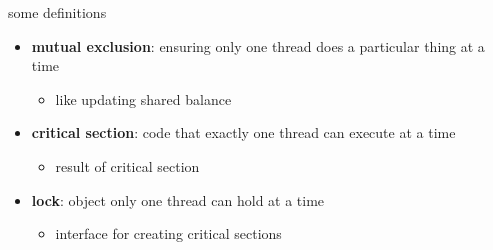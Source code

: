 \begin{frame}{some definitions}
\begin{itemize}
\item \textbf{mutual exclusion}: ensuring only one thread does a particular thing at a time
    \begin{itemize}
        \item like updating shared balance
    \end{itemize}
\item<2-> \textbf{critical section}: code that exactly one thread can execute at a time
    \begin{itemize}
        \item result of critical section
    \end{itemize}
\item<3-> \textbf{lock}: object only one thread can hold at a time
    \begin{itemize}
        \item interface for creating critical sections
    \end{itemize}
\end{itemize}
\end{frame}
